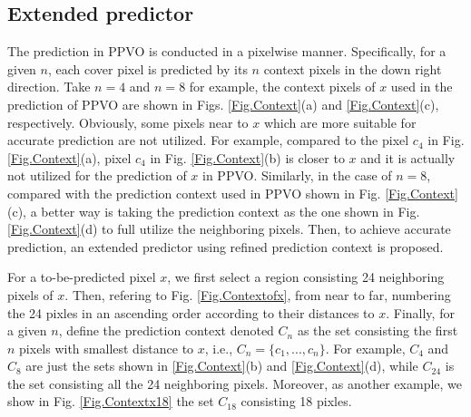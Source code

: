\documentclass[review,3p,10pt,sort&compress]{elsarticle}
\begin{document}
\subsection{Extended predictor}\label{sec:3.1}
The prediction in PPVO is conducted in a pixelwise manner. Specifically, for a given $n$, each cover pixel is predicted by its $n$ context pixels in the down right direction. Take $n=4$ and $n=8$ for example, the context pixels of $x$ used in the prediction of PPVO are shown in Figs. \ref{Fig.Context}(a) and \ref{Fig.Context}(c), respectively. Obviously, some pixels near to $x$ which are more suitable for accurate prediction are not utilized. For example, compared to the pixel $c_4$ in Fig. \ref{Fig.Context}(a), pixel $c_4$ in Fig. \ref{Fig.Context}(b) is closer to $x$ and it is actually not utilized for the prediction of $x$ in PPVO.
Similarly, in the case of $n=8$, compared with the prediction context used in PPVO shown in Fig. \ref{Fig.Context}(c), a better way is taking the prediction context as the one shown in Fig. \ref{Fig.Context}(d) to full utilize the neighboring pixels. Then, to achieve accurate prediction, an extended predictor using refined prediction context is proposed.

For a to-be-predicted pixel $x$, we first select a region consisting 24 neighboring pixels of $x$.   Then, refering to Fig. \ref{Fig.Contextofx}, from near to far, numbering the 24 pixles in an ascending order according to their distances to $x$. Finally, for a given $n$, define the prediction context denoted $C_n$ as the set consisting the first $n$ pixels with smallest distance to $x$, i.e., $C_n = \{c_1,...,c_n\}$. For example, $C_4$ and $C_8$ are just the sets shown in  \ref{Fig.Context}(b) and \ref{Fig.Context}(d), while $C_{24}$ is the set consisting all the 24 neighboring pixels. Moreover, as another example, we show in Fig. \ref{Fig.Contextx18} the set $C_{18}$ consisting 18 pixles.
\end{document}
